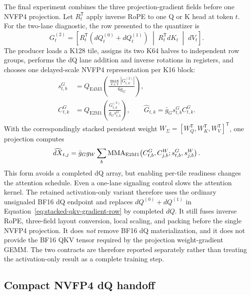 The final experiment combines the three projection-gradient fields before one
NVFP4 projection.  Let $R_t^{\mathsf T}$ apply inverse RoPE to one Q or K
head at token $t$.  For the two-lane diagnostic, the row presented to the
quantizer is
\begin{equation}
  G_t^{(2)}=
  \left[
    R_t^{\mathsf T}\!\left(dQ_t^{(0)}+dQ_t^{(1)}\right)
    \;\middle|\;
    R_t^{\mathsf T}dK_t
    \;\middle|\;
    dV_t
  \right].
  \label{eq:stacked-qkv-gradient-row}
\end{equation}
The producer loads a K128 tile, assigns its two K64 halves to independent row
groups, performs the dQ lane addition and inverse rotations in registers, and
chooses one delayed-scale NVFP4 representation per K16 block:
\begin{align}
  s^G_{t,b}
    &=Q_{\mathrm{E4M3}}\!\left(
      \frac{\max_{k\in b}|G^{(2)}_{t,k}|}{6\bar g_G}
    \right),\\
  C^G_{t,k}
    &=Q_{\mathrm{E2M1}}\!\left(
      \frac{G^{(2)}_{t,k}}{\bar g_Gs^G_{t,b}}
    \right),\qquad
  \widehat G_{t,k}=\bar g_Gs^G_{t,b}C^G_{t,k}.
  \label{eq:stacked-qkv-gradient-nvfp4}
\end{align}
With the correspondingly stacked persistent weight
$W_\Sigma=[W_Q^{\mathsf T},W_K^{\mathsf T},W_V^{\mathsf T}]^{\mathsf T}$,
one projection computes
\begin{equation}
  \widehat{dX}_{t,j}
  =\bar g_Gg_W\sum_b
    \operatorname{MMA}_{\mathrm{E2M1}}\!\left(
      C^G_{t,b},C^W_{j,b};s^G_{t,b},s^W_{j,b}
    \right).
  \label{eq:stacked-qkv-gradient-projection}
\end{equation}
This form avoids a completed dQ array, but enabling per-tile readiness changes
the attention schedule.  Even a one-lane signaling control slows the attention
kernel.  The retained activation-only variant therefore uses the ordinary
unsignaled BF16 dQ endpoint and replaces $dQ^{(0)}+dQ^{(1)}$ in
Equation~\ref{eq:stacked-qkv-gradient-row} by completed $dQ$.  It still fuses
inverse RoPE, three-field layout conversion, local scaling, and packing before
the single NVFP4 projection.  It does \emph{not} remove BF16 dQ
materialization, and it does not provide the BF16 QKV tensor required by the
projection weight-gradient GEMM.  The two contracts are therefore reported
separately rather than treating the activation-only result as a complete
training step.

\subsection{Compact NVFP4 dQ handoff}

